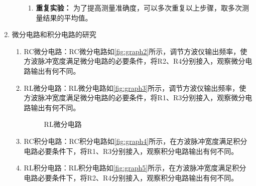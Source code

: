 \documentclass[dvipsnames, svgnames,a4paper,11pt]{article}
\begin{document}
\begin{enumerate}
\begin{enumerate}
\begin{enumerate}
				\item \textbf{重复实验：} 为了提高测量准确度，可以多次重复以上步骤，取多次测量结果的平均值。
			\end{enumerate}
		\end{enumerate}
		
		\item 微分电路和积分电路的研究
		\begin{enumerate}
			\item RC微分电路：RC微分电路如\cref{fig:graph2}所示，调节方波仪输出频率，使方波脉冲宽度满足微分电路的必要条件，将R2、R4分别接入，观察微分电路输出有何不同。
			
			
			\item RL微分电路：RL微分电路如\cref{fig:graph3}所示，调节方波仪输出频率，使方波脉冲宽度满足微分电路的必要条件，将R1、R3分别接入，观察微分电路输出有何不同。
			
			\begin{figure}[htbp]
				\centering
				\quad
				\quad
				\caption{RL微分电路}
				\label{fig:graph2-1}
			\end{figure}


			
			\item RC积分电路：RC积分电路如\cref{fig:graph4}所示，在方波脉冲宽度满足积分电路必要条件下，将R1、R3分别接入，观察积分电路输出有何不同。
			
			
			\item RL积分电路：RL积分电路如\cref{fig:graph5}所示，在方波脉冲宽度满足积分电路必要条件下，将R2、R4分别接入，观察积分电路输出有何不同。
			

\end{enumerate}
\end{enumerate}
\end{document}

